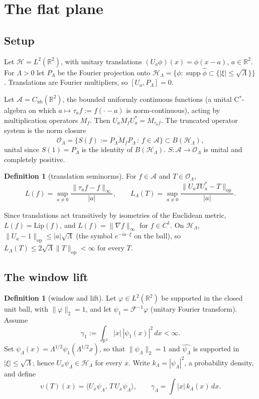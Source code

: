 \documentclass[11pt,a4paper]{article}
\theoremstyle{plain}
\theoremstyle{definition}
\newtheorem{definition}[theorem]{Definition}
\newcommand{\Hilb}{\mathcal{H}}
\newcommand{\Op}{\mathcal{O}}
\newcommand{\Acal}{\mathcal{A}}
\newcommand{\opnorm}[1]{\lVert #1 \rVert_{\mathrm{op}}}
\newcommand{\supnorm}[1]{\lVert #1 \rVert_{\infty}}
\newcommand{\norm}[1]{\lVert #1 \rVert}
\newcommand{\R}{\mathbb{R}}
\newcommand{\Lip}{\mathrm{Lip}}
\begin{document}
\section{The flat plane}
\label{sec:plane}

\subsection{Setup}
Let $\Hilb=L^{2}(\R^{2})$, with unitary translations
$(U_{a}\phi)(x)=\phi(x-a)$, $a\in\R^{2}$. For $\Lambda>0$ let $P_{\Lambda}$
be the Fourier projection onto $\Hilb_{\Lambda}=\{\phi:\operatorname{supp}
\widehat\phi\subset\{|\xi|\le\sqrt\Lambda\}\}$. Translations are Fourier
multipliers, so $[U_{a},P_{\Lambda}]=0$.

Let $\Acal=C_{\mathrm{ub}}(\R^{2})$, the bounded uniformly continuous
functions (a unital C$^{*}$-algebra on which $a\mapsto\tau_{a}f:=f(\cdot-a)$
is norm-continuous), acting by multiplication operators $M_{f}$. Then
$U_{a}M_{f}U_{a}^{*}=M_{\tau_{a}f}$. The truncated operator system is the
norm closure
\[
\Op_{\Lambda}=\overline{\{S(f):=P_{\Lambda}M_{f}P_{\Lambda}\,:\,f\in\Acal\}}
\subset B(\Hilb_{\Lambda}),
\]
unital since $S(1)=P_{\Lambda}$ is the identity of $B(\Hilb_{\Lambda})$.
$S:\Acal\to\Op_{\Lambda}$ is unital and completely positive.

\begin{definition}[translation seminorms]\label{def:translation}
For $f\in\Acal$ and $T\in\Op_{\Lambda}$,
\[
L(f)=\sup_{a\ne0}\frac{\supnorm{\tau_{a}f-f}}{|a|},\qquad
L_{\Lambda}(T)=\sup_{a\ne0}\frac{\opnorm{U_{a}TU_{a}^{*}-T}}{|a|}.
\]
\end{definition}
Since translations act transitively by isometries of the Euclidean
metric, $L(f)=\Lip(f)$, and $L(f)=\supnorm{\nabla f}$ for $f\in C^{1}$.
On $\Hilb_{\Lambda}$, $\opnorm{U_{a}-1}\le|a|\sqrt\Lambda$ (the symbol
$e^{-ia\cdot\xi}$ on the ball), so $L_{\Lambda}(T)\le2\sqrt\Lambda
\opnorm{T}<\infty$ for every $T$.

\subsection{The window lift}
\begin{definition}[window and lift]\label{def:window}
Let $\varphi\in L^{2}(\R^{2})$ be supported in the closed unit ball, with
$\norm{\varphi}_{2}=1$, and let $\psi_{1}=\mathcal F^{-1}\varphi$
(unitary Fourier transform). Assume
\begin{equation}\label{eq:gamma1}
\gamma_{1}:=\int_{\R^{2}}|x|\,|\psi_{1}(x)|^{2}\,dx<\infty .
\end{equation}
Set $\psi_{\Lambda}(x)=\Lambda^{1/2}\psi_{1}(\Lambda^{1/2}x)$, so that
$\norm{\psi_{\Lambda}}_{2}=1$ and $\widehat{\psi_{\Lambda}}$ is supported
in $|\xi|\le\sqrt\Lambda$; hence $U_{x}\psi_{\Lambda}\in\Hilb_{\Lambda}$
for every $x$. Write $k_{\Lambda}=|\psi_{\Lambda}|^{2}$, a probability
density, and define
\[
\upsilon(T)(x)=\langle U_{x}\psi_{\Lambda},\,T\,U_{x}\psi_{\Lambda}\rangle,
\qquad
\gamma_{\Lambda}=\int|x|\,k_{\Lambda}(x)\,dx .
\]
\end{definition}
\end{document}
